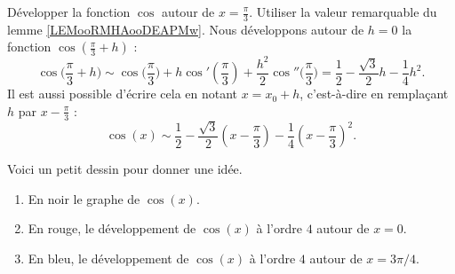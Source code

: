 \begin{example}     \label{developcosenpisur3}
	Développer la fonction \( \cos\) autour de \( x=\frac{ \pi }{ 3 }\). Utiliser la valeur remarquable du lemme \ref{LEMooRMHAooDEAPMw}. Nous développons autour de \( h=0\) la fonction \( \cos(\frac{ \pi }{ 3 }+h)\) :
	\begin{equation}
		\cos\big( \frac{ \pi }{ 3 }+h \big)\sim \cos\big( \frac{ \pi }{ 3 } \big)+h\cos'(\frac{ \pi }{ 3 })+\frac{ h^2 }{2}\cos''\big( \frac{ \pi }{ 3 } \big)=\frac{ 1 }{2}-\frac{ \sqrt{3} }{2}h-\frac{1}{ 4 }h^2.
	\end{equation}
	Il est aussi possible d'écrire cela en notant \( x=x_0+h\), c'est-à-dire en remplaçant \( h\) par \( x-\frac{ \pi }{ 3 }\) :
	\begin{equation}
		\cos(x)\sim\frac{ 1 }{2}-\frac{ \sqrt{3} }{ 2 }(x-\frac{ \pi }{ 3 })-\frac{1}{ 4 }(x-\frac{ \pi }{ 3 })^2.
	\end{equation}
\end{example}

\begin{normaltext}
	Voici un petit dessin pour donner une idée.
	\begin{center}
		
	\end{center}
	\begin{enumerate}
		\item
		      En noir le graphe de \( \cos(x)\).
		\item
		      En rouge, le développement de \( \cos(x)\) à l'ordre \( 4\) autour de \( x=0\).
		\item
		      En bleu, le développement de \( \cos(x)\) à l'ordre \( 4\) autour de \( x=3\pi/4\).
	\end{enumerate}
\end{normaltext}



